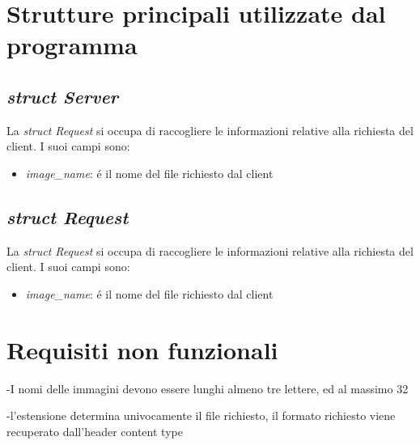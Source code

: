 \documentclass[a4paper, titlepage]{article}
\begin{document}
	\section{Strutture principali utilizzate dal programma}
		\subsection{\textit{struct Server}}
	\begin{flushleft}
		La \textit{struct Request} si occupa di raccogliere le informazioni relative alla richiesta del client. I suoi campi sono:
		\begin{itemize}
			\item \textit{image\_name}: \'{e} il nome del file richiesto dal client
		\end{itemize}
	\end{flushleft}
	\subsection{\textit{struct Request}}
	\begin{flushleft}
		La \textit{struct Request} si occupa di raccogliere le informazioni relative alla richiesta del client. I suoi campi sono:
		\begin{itemize}
			\item \textit{image\_name}: \'{e} il nome del file richiesto dal client
		\end{itemize}
	\end{flushleft}
	
	\section{Requisiti non funzionali}
	\begin{flushleft}
		-I nomi delle immagini devono essere lunghi almeno tre lettere, ed al massimo 32

		-l'estensione determina univocamente il file richiesto, il formato richiesto viene recuperato dall'header content type
	\end{flushleft}
	
\end{document}
